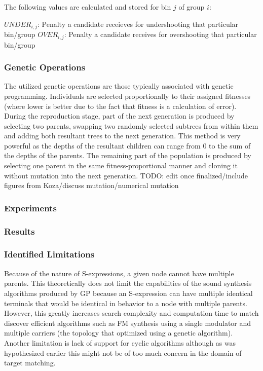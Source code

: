 \documentclass[12pt]{article}
\begin{document}
The following values are calculated and stored for bin $j$ of group $i$:
\begin{enumerate}
$UNDER_{i, j}$: Penalty a candidate receieves for undershooting that particular bin/group
$OVER_{i, j}$: Penalty a candidate receives for overshooting that particular bin/group
\end{enumerate}

\subsubsection{Genetic Operations}
The utilized genetic operations are those typically associated with genetic programming. Individuals are selected proportionally to their assigned fitnesses (where lower is better due to the fact that fitness is a calculation of error). During the reproduction stage, part of the next generation is produced by selecting two parents, swapping two randomly selected subtrees from within them and adding both resultant trees to the next generation. This method is very powerful as the depths of the resultant children can range from 0 to the sum of the depths of the parents. The remaining part of the population is produced by selecting one parent in the same fitness-proportional manner and cloning it without mutation into the next generation. TODO: edit once finalized/include figures from Koza/discuss mutation/numerical mutation
\subsubsection{Experiments}
\begin{comment}
Ideally one would ``clean'' the WAV file as much as possible by removing areas of silence, removing any DC offset and normalizing.
\end{comment}
\subsubsection{Results}
\subsubsection{Identified Limitations}
Because of the nature of S-expressions, a given node cannot have multiple parents. This theoretically does not limit the capabilities of the sound synthesis algorithms produced by GP because an S-expression can have multiple identical terminals that would be identical in behavior to a node with multiple parents. However, this greatly increases search complexity and computation time to match discover efficient algorithms such as FM synthesis using a single modulator and multiple carriers (the topology that \citep{horner1993machine} optimized using a genetic algorithm). Another limitation is lack of support for cyclic algorithms although as was hypothesized earlier this might not be of too much concern in the domain of target matching.
\end{document}
